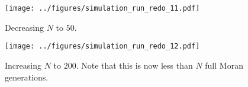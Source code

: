 \documentclass[13pt]{amsart}
\begin{document}
\begin{figure}
    \texttt{[image: ../figures/simulation\_run\_redo\_11.pdf]}
    \caption{Decreasing $N$ to $50$.}
    \label{fig:prelim_11}
\end{figure}

\begin{figure}
    \texttt{[image: ../figures/simulation\_run\_redo\_12.pdf]}
    \caption{Increasing $N$ to $200$.
    Note that this is now less than $N$ full Moran generations.}
    \label{fig:prelim_12}
\end{figure}
\end{document}
